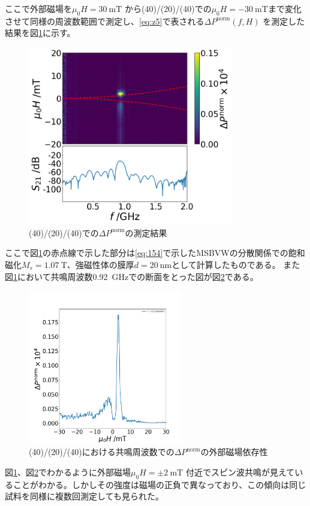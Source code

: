 \documentclass[dvipdfmx,11pt]{jsreport}
\numberwithin{equation}{chapter}
\numberwithin{table}{chapter}
\begin{document}
ここで外部磁場を$\mu_0 H=\SI{30}{\milli \tesla}$ から(40)/(20)/(40)での$\mu_0 H=\SI{-30}{\milli \tesla}$まで変化させて同様の周波数範囲で測定し、\eqref{eq:z5}で表される$\Delta P^{\text{norm}}(f,H)$ を測定した結果を図\ref{fig:pppfig-0120ppp17-1power-png}に示す。
\begin{figure}[H]
	\centering
	\includegraphics[width=0.80\textwidth]{pppfig/ptpyptp.png}
	\caption{(40)/(20)/(40)での$\Delta P^{\text{norm}}$の測定結果}
	\label{fig:pppfig-0120ppp17-1power-png}
\end{figure}
ここで図\ref{fig:pppfig-0120ppp17-1power-png}の赤点線で示した部分は\eqref{eq:154}で示したMSBVWの分散関係での飽和磁化$M_s=\SI{1.07}{\tesla}$、強磁性体の膜厚$d=\SI{20}{\nano \metre}$として計算したものである。
また図\ref{fig:pppfig-0120ppp17-1power-png}において共鳴周波数\SI{0.92}{\giga \hertz}での断面をとった図が図\ref{fig:pppfig-0120ppp17-1danmen-png}である。
\begin{figure}[H]
	\centering
	\includegraphics[width=0.6\textwidth]{pppfig/0120ppp17-1danmen.png}
	\caption{\normalsize{(40)/(20)/(40)における共鳴周波数での$\Delta P^{\text{norm}}$の外部磁場依存性}}
	\label{fig:pppfig-0120ppp17-1danmen-png}
\end{figure}
図\ref{fig:pppfig-0120ppp17-1power-png}、図\ref{fig:pppfig-0120ppp17-1danmen-png}でわかるように外部磁場$\mu_0 H=\pm\SI{2}{\milli \tesla}$ 付近でスピン波共鳴が見えていることがわかる。しかしその強度は磁場の正負で異なっており、この傾向は同じ試料を同様に複数回測定しても見られた。
\end{document}
